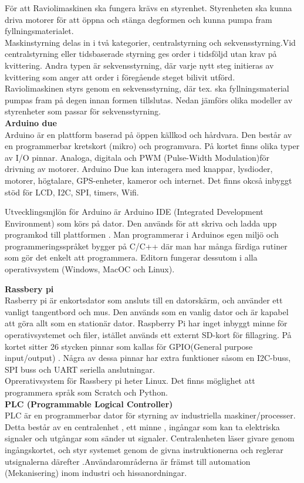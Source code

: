 För att Raviolimaskinen ska fungera krävs en styrenhet. Styrenheten ska kunna driva motorer för att öppna och stänga degformen  och kunna pumpa fram fyllningsmaterialet.\\

Maskinstyrning delas in  i två kategorier, centralstyrning och sekvensstyrning.Vid centralstyrning eller tidsbaserade styrning ges order i tidsföljd utan krav på kvittering. Andra typen är sekvensstyrning, där varje nytt steg initieras av kvittering som anger  att order i föregående steget bilivit utförd.\\

Raviolimaskinen styrs genom en sekvensstyrning, där tex. ska fyllningsmaterial pumpas fram på degen innan formen tillslutas. Nedan jämförs olika modeller av styrenheter som passar för sekvensstyrning.\\

\textbf{Arduino due}\\
Arduino är en plattform baserad på öppen källkod och hårdvara. Den består av en  programmerbar kretskort (mikro) och programvara. På kortet finns olika typer av I/O pinnar. Analoga, digitala och  PWM (Pulse-Width Modulation)för drivning av motorer. Arduino Due kan interagera med knappar, lysdioder, motorer, högtalare, GPS-enheter, kameror och internet. Det finns okcså inbyggt stöd för LCD, I2C, SPI, timers, Wifi.

Utvecklingsmjlön för Arduino är Arduino IDE (Integrated Development Environment) som körs på  dator. Den används för att skriva och ladda upp programkod till plattformen \cite{Arduino1}. Man programmerar i Arduinos egen miljö och programmeringsspråket bygger på  C/C++ där man har många färdiga rutiner som gör det enkelt att programmera\cite{Arduino2}. Editorn fungerar dessutom i alla operativsystem (Windows, MacOC och Linux).
 
 
 
\textbf{Rassbery pi}\\
Rasberry pi är enkortsdator som ansluts till en datorskärm, och använder ett vanligt tangentbord och mus. Den  används som en vanlig dator och  är kapabel att göra allt som en stationär dator. Raspberry Pi har inget inbyggt minne för operativsystemet och filer, istället används ett externt SD-kort för fillagring. På kortet sitter 26 stycken pinnar som kallas för GPIO(General purpose input/output) . Några av dessa pinnar har extra funktioner såsom en I2C-buss, SPI buss och UART seriella anslutningar\cite{Raspberry1}. \\

Oprerativsystem för Rassbery pi heter Linux. Det finns möglighet att programmera språk som Scratch och Python.\\

\textbf{
PLC (Programmable Logical Controller) }\\
PLC är en programmerbar dator för styrning av industriella maskiner/processer. Detta består av en centralenhet , ett minne , ingångar som kan ta elektriska signaler och utgångar som sänder ut signaler. Centralenheten läser givare genom ingångskortet, och styr systemet genom de givna instruktionerna och reglerar utsignalerna därefter .Användarområderna  är främst till automation (Mekanisering) inom industri och hissanordningar.
